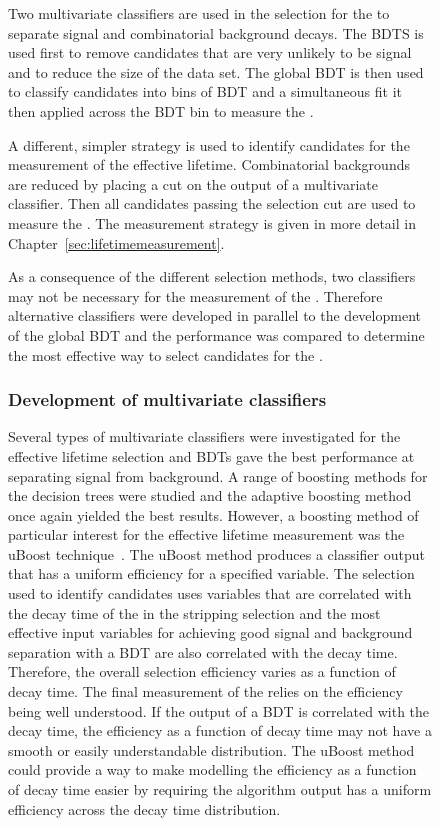 \begin{figure}[tbp]
Two multivariate classifiers are used in the selection for the \BFm to separate signal and combinatorial background decays. The BDTS is used first to remove candidates that are very unlikely to be signal and to reduce the size of the data set. The global BDT is then used to classify candidates into bins of BDT and a simultaneous fit it then applied across the BDT bin to measure the \BFs.

A different, simpler strategy is used to identify candidates for the measurement of the \bsmumu effective lifetime. Combinatorial backgrounds are reduced by placing a cut on the output of a multivariate classifier. Then all candidates passing the selection cut are used to measure the \el. The measurement strategy is given in more detail in Chapter~\ref{sec:lifetimemeasurement}. 

As a consequence of the different selection methods, two classifiers may not be necessary for the measurement of the \el. Therefore alternative classifiers were developed in parallel to the development of the global BDT and the performance was compared to determine the most effective way to select candidates for the \elm. 

\subsubsection{Development of \el multivariate classifiers}
\label{sec:dev_BDTs}
Several types of multivariate classifiers were investigated for the effective lifetime selection and BDTs gave the best performance at separating signal from background. A range of boosting methods for the decision trees were studied and the adaptive boosting method once again yielded the best results. %
However, a boosting method of particular interest for the effective lifetime measurement was the uBoost technique~\cite{Stevens:2013dya}. The uBoost method produces a classifier output that has a uniform efficiency for a specified variable. The selection used to identify \bsmumu candidates uses variables that are correlated with the decay time of the \bs in the stripping selection and the most effective input variables for achieving good signal and background separation with a BDT are also correlated with the decay time. Therefore, the overall selection efficiency varies as a function of decay time. The final measurement of the \el relies on the efficiency being well understood. If the output of a BDT is correlated with the \bs decay time, the efficiency as a function of decay time may not have a smooth or easily understandable distribution. The uBoost method could provide a way to make modelling the efficiency as a function of decay time easier by requiring the algorithm output has a uniform efficiency across the decay time distribution.


\end{figure}
